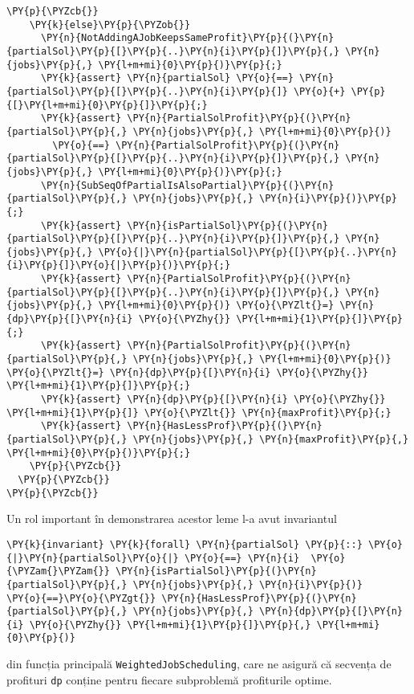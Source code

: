 \begin{itemize}
\begin{Verbatim}[commandchars=\\\{\},fontsize=\footnotesize]
    \PY{p}{\PYZcb{}}
    \PY{k}{else}\PY{p}{\PYZob{}}
      \PY{n}{NotAddingAJobKeepsSameProfit}\PY{p}{(}\PY{n}{partialSol}\PY{p}{[}\PY{p}{..}\PY{n}{i}\PY{p}{]}\PY{p}{,} \PY{n}{jobs}\PY{p}{,} \PY{l+m+mi}{0}\PY{p}{)}\PY{p}{;}
      \PY{k}{assert} \PY{n}{partialSol} \PY{o}{==} \PY{n}{partialSol}\PY{p}{[}\PY{p}{..}\PY{n}{i}\PY{p}{]} \PY{o}{+} \PY{p}{[}\PY{l+m+mi}{0}\PY{p}{]}\PY{p}{;}
      \PY{k}{assert} \PY{n}{PartialSolProfit}\PY{p}{(}\PY{n}{partialSol}\PY{p}{,} \PY{n}{jobs}\PY{p}{,} \PY{l+m+mi}{0}\PY{p}{)}
        \PY{o}{==} \PY{n}{PartialSolProfit}\PY{p}{(}\PY{n}{partialSol}\PY{p}{[}\PY{p}{..}\PY{n}{i}\PY{p}{]}\PY{p}{,} \PY{n}{jobs}\PY{p}{,} \PY{l+m+mi}{0}\PY{p}{)}\PY{p}{;}
      \PY{n}{SubSeqOfPartialIsAlsoPartial}\PY{p}{(}\PY{n}{partialSol}\PY{p}{,} \PY{n}{jobs}\PY{p}{,} \PY{n}{i}\PY{p}{)}\PY{p}{;}
      \PY{k}{assert} \PY{n}{isPartialSol}\PY{p}{(}\PY{n}{partialSol}\PY{p}{[}\PY{p}{..}\PY{n}{i}\PY{p}{]}\PY{p}{,} \PY{n}{jobs}\PY{p}{,} \PY{o}{|}\PY{n}{partialSol}\PY{p}{[}\PY{p}{..}\PY{n}{i}\PY{p}{]}\PY{o}{|}\PY{p}{)}\PY{p}{;}
      \PY{k}{assert} \PY{n}{PartialSolProfit}\PY{p}{(}\PY{n}{partialSol}\PY{p}{[}\PY{p}{..}\PY{n}{i}\PY{p}{]}\PY{p}{,} \PY{n}{jobs}\PY{p}{,} \PY{l+m+mi}{0}\PY{p}{)} \PY{o}{\PYZlt{}=} \PY{n}{dp}\PY{p}{[}\PY{n}{i} \PY{o}{\PYZhy{}} \PY{l+m+mi}{1}\PY{p}{]}\PY{p}{;}
      \PY{k}{assert} \PY{n}{PartialSolProfit}\PY{p}{(}\PY{n}{partialSol}\PY{p}{,} \PY{n}{jobs}\PY{p}{,} \PY{l+m+mi}{0}\PY{p}{)}  \PY{o}{\PYZlt{}=} \PY{n}{dp}\PY{p}{[}\PY{n}{i} \PY{o}{\PYZhy{}} \PY{l+m+mi}{1}\PY{p}{]}\PY{p}{;}
      \PY{k}{assert} \PY{n}{dp}\PY{p}{[}\PY{n}{i} \PY{o}{\PYZhy{}} \PY{l+m+mi}{1}\PY{p}{]} \PY{o}{\PYZlt{}} \PY{n}{maxProfit}\PY{p}{;}
      \PY{k}{assert} \PY{n}{HasLessProf}\PY{p}{(}\PY{n}{partialSol}\PY{p}{,} \PY{n}{jobs}\PY{p}{,} \PY{n}{maxProfit}\PY{p}{,} \PY{l+m+mi}{0}\PY{p}{)}\PY{p}{;}
    \PY{p}{\PYZcb{}}
  \PY{p}{\PYZcb{}}
\PY{p}{\PYZcb{}}
\end{Verbatim}
\end{itemize}
Un rol important în demonstrarea acestor leme l-a avut invariantul 
\begin{Verbatim}[commandchars=\\\{\}, fontsize=\footnotesize]
\PY{k}{invariant} \PY{k}{forall} \PY{n}{partialSol} \PY{p}{::} \PY{o}{|}\PY{n}{partialSol}\PY{o}{|} \PY{o}{==} \PY{n}{i}  \PY{o}{\PYZam{}\PYZam{}} \PY{n}{isPartialSol}\PY{p}{(}\PY{n}{partialSol}\PY{p}{,} \PY{n}{jobs}\PY{p}{,} \PY{n}{i}\PY{p}{)} 
\PY{o}{==}\PY{o}{\PYZgt{}} \PY{n}{HasLessProf}\PY{p}{(}\PY{n}{partialSol}\PY{p}{,} \PY{n}{jobs}\PY{p}{,} \PY{n}{dp}\PY{p}{[}\PY{n}{i} \PY{o}{\PYZhy{}} \PY{l+m+mi}{1}\PY{p}{]}\PY{p}{,} \PY{l+m+mi}{0}\PY{p}{)} 
\end{Verbatim}
din funcția principală \texttt{WeightedJobScheduling}, care ne asigură că secvența de profituri \texttt{dp} conține pentru fiecare subproblemă profiturile optime. 
